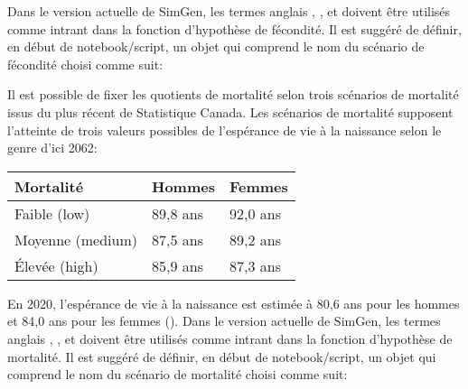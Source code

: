 \documentclass[letterpaper,10pt,french]{sphinxmanual}
\begin{document}
Dans le version actuelle de SimGen, les termes anglais , , et  doivent être utilisés comme intrant dans la fonction d’hypothèse de fécondité.
Il est suggéré de définir, en début de notebook/script, un objet qui comprend le nom du scénario de fécondité choisi comme suit:

\begin{sphinxVerbatim}[commandchars=\\\{\}]
  
\end{sphinxVerbatim}


Il est possible de fixer les quotients de mortalité selon trois scénarios de mortalité issus du plus récent  de Statistique Canada.
Les scénarios de mortalité supposent l’atteinte de trois valeurs possibles de l’espérance de vie à la naissance selon le genre d’ici 2062:


\begin{savenotes}\sphinxattablestart
\centering
\begin{tabulary}{\linewidth}[t]{|T|T|T|}
\hline
\sphinxstyletheadfamily 
Mortalité
&\sphinxstyletheadfamily 
Hommes
&\sphinxstyletheadfamily 
Femmes
\\
\hline
Faible (low)
&
89,8 ans
&
92,0 ans
\\
\hline
Moyenne (medium)
&
87,5 ans
&
89,2 ans
\\
\hline
Élevée (high)
&
85,9 ans
&
87,3 ans
\\
\hline
\end{tabulary}
\par
\sphinxattableend\end{savenotes}

En 2020, l’espérance de vie à la naissance est estimée à 80,6 ans pour les hommes et 84,0 ans pour les femmes ().
Dans le version actuelle de SimGen, les termes anglais , , et  doivent être utilisés comme intrant dans la fonction d’hypothèse de mortalité.
Il est suggéré de définir, en début de notebook/script, un objet qui comprend le nom du scénario de mortalité choisi comme suit:
\end{document}
